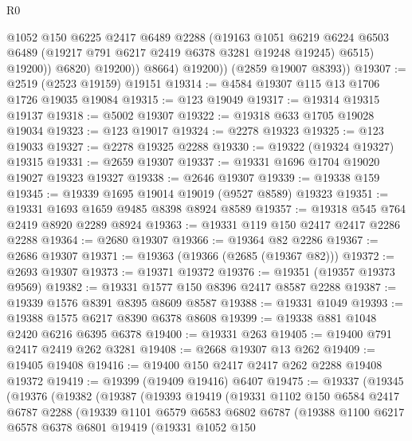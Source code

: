 \begin{lexlean}{R0}
\begin{coremodule}
                      @1052
                      @150
                      @6225
                      @2417
                      @6489
                      @2288
                      (@19163
                        @1051
                        @6219
                        @6224
                        @6503
                        @6489
                        (@19217 @791 @6217 @2419 @6378 @3281 @19248 @19245)
                        @6515)
                      @19200))
                  @6820)
                @19200))
            @8664)
          @19200))
      (@2859 @19007 @8393))
@19307 := @2519 (@2523 @19159) @19151
@19314 := @4584 @19307 @115 @13 @1706 @1726 @19035 @19084
@19315 := @123 @19049
@19317 := @19314 @19315 @19137
@19318 := @5002 @19307
@19322 := @19318 @633 @1705 @19028 @19034
@19323 := @123 @19017
@19324 := @2278 @19323
@19325 := @123 @19033
@19327 := @2278 @19325 @2288
@19330 := @19322 (@19324 @19327) @19315
@19331 := @2659 @19307
@19337 := @19331 @1696 @1704 @19020 @19027 @19323 @19327
@19338 := @2646 @19307
@19339 := @19338 @159
@19345 := @19339 @1695 @19014 @19019 (@9527 @8589) @19323
@19351 := @19331 @1693 @1659 @9485 @8398 @8924 @8589
@19357 := @19318 @545 @764 @2419 @8920 @2289 @8924
@19363 := @19331 @119 @150 @2417 @2417 @2286 @2288
@19364 := @2680 @19307
@19366 := @19364 @82 @2286
@19367 := @2686 @19307
@19371 := @19363 (@19366 (@2685 (@19367 @82)))
@19372 := @2693 @19307
@19373 := @19371 @19372
@19376 := @19351 (@19357 @19373 @9569)
@19382 := @19331 @1577 @150 @8396 @2417 @8587 @2288
@19387 := @19339 @1576 @8391 @8395 @8609 @8587
@19388 := @19331 @1049
@19393 := @19388 @1575 @6217 @8390 @6378 @8608
@19399 := @19338 @881 @1048 @2420 @6216 @6395 @6378
@19400 := @19331 @263
@19405 := @19400 @791 @2417 @2419 @262 @3281
@19408 := @2668 @19307 @13 @262
@19409 := @19405 @19408
@19416 := @19400 @150 @2417 @2417 @262 @2288 @19408 @19372
@19419 := @19399 (@19409 @19416) @6407
@19475 := @19337
    (@19345
      (@19376
        (@19382
          (@19387
            (@19393
              @19419
              (@19331
                @1102
                @150
                @6584
                @2417
                @6787
                @2288
                (@19339
                  @1101
                  @6579
                  @6583
                  @6802
                  @6787
                  (@19388
                    @1100
                    @6217
                    @6578
                    @6378
                    @6801
                    @19419
                    (@19331
                      @1052
                      @150

\end{coremodule}
\end{lexlean}
